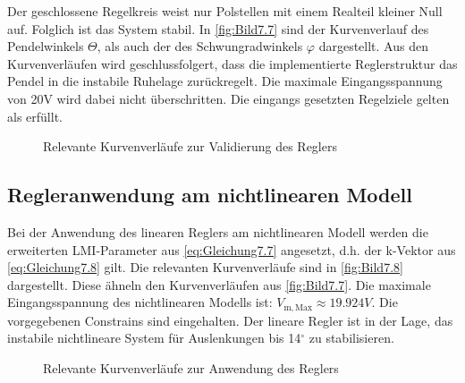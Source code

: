 Der geschlossene Regelkreis weist nur Polstellen mit einem Realteil kleiner Null auf. Folglich ist das System stabil. In \autoref{fig:Bild7.7} sind der Kurvenverlauf des Pendelwinkels $\Theta$, als auch der des Schwungradwinkels $\varphi$ dargestellt. Aus den Kurvenverläufen wird geschlussfolgert, dass die implementierte Reglerstruktur das Pendel in die instabile Ruhelage zurückregelt. Die maximale Eingangsspannung von 20V wird dabei nicht überschritten. Die eingangs gesetzten Regelziele gelten als erfüllt.

\begin{figure}[H]
   \centering
   \caption[Relevante Kurvenverläufe zur Validierung des Reglers]{Relevante Kurvenverläufe zur Validierung des Reglers}
   \label{fig:Bild7.7}
\end{figure}

\subsection{Regleranwendung am nichtlinearen Modell}
\label{sec:Regleranwendung}

Bei der Anwendung des linearen Reglers am nichtlinearen Modell werden die erweiterten LMI-Parameter aus \autoref{eq:Gleichung7.7} angesetzt, d.h. der k-Vektor aus \autoref{eq:Gleichung7.8} gilt. Die relevanten Kurvenverläufe sind in \autoref{fig:Bild7.8} dargestellt. Diese ähneln den Kurvenverläufen aus \autoref{fig:Bild7.7}. Die maximale Eingangsspannung des nichtlinearen Modells ist: $V_{\mathrm{m,Max}} \approx 19.924V$. Die vorgegebenen Constrains sind eingehalten. Der lineare Regler ist in der Lage, das instabile nichtlineare System für Auslenkungen bis 14$^\circ$ zu stabilisieren.

\begin{figure}[H]
   \centering
   \caption[Relevante Kurvenverläufe zur Anwendung des Reglers]{Relevante Kurvenverläufe zur Anwendung des Reglers}
   \label{fig:Bild7.8}
\end{figure}